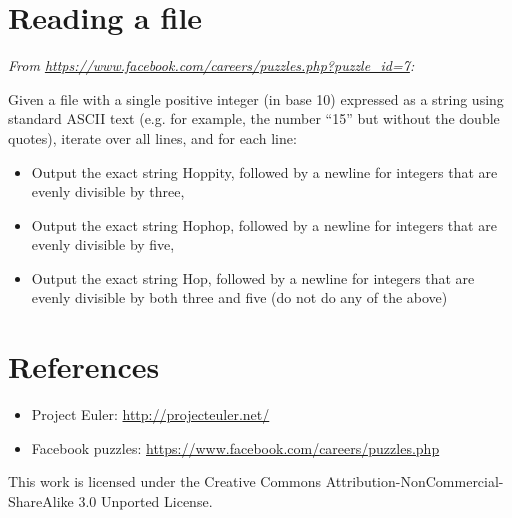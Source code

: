 \documentclass[draft=false]{article}
\newcommand{\answer}[1]{}%
\begin{document}
\answer{Not available yet}

\section{Reading a file}
\emph{From \url{https://www.facebook.com/careers/puzzles.php?puzzle_id=7}:}

Given a file with a single positive integer (in base 10) expressed as a string using standard ASCII text (e.g. for example, the number ``15'' but without the double quotes), iterate over all lines, and for each line:

\begin{itemize}
\item Output the exact string Hoppity, followed by a newline for integers that are evenly divisible by three,
\item Output the exact string Hophop, followed by a newline for integers that are evenly divisible by five,
\item Output the exact string Hop, followed by a newline for integers that are evenly divisible by both three and five (do not do any of the above)
\end{itemize}

\answer{Not available yet}

\section*{References}

\begin{itemize}
\item Project Euler: \url{http://projecteuler.net/}
\item Facebook puzzles: \url{https://www.facebook.com/careers/puzzles.php}
\end{itemize}

This work is licensed under the Creative Commons Attribution-NonCommercial-ShareAlike 3.0 Unported License.
\end{document}
